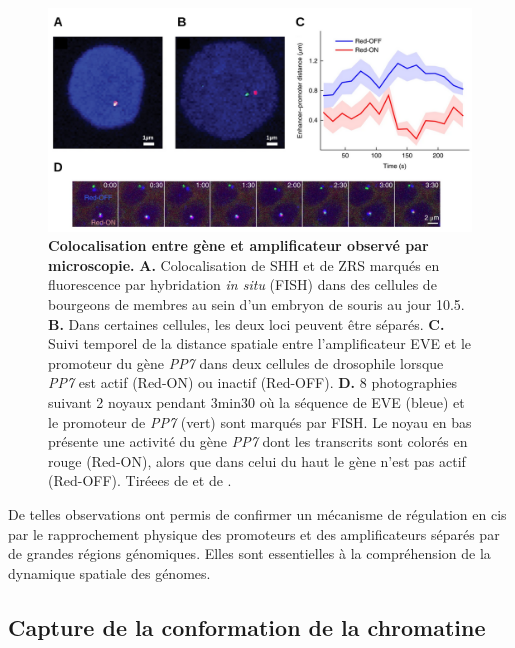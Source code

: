 \begin{figure}[h]
 \centering
 \includegraphics[width=1\textwidth, page=1] {figures/introduction/fig15-17.png}
 \caption[Colocalisation entre gène et \gls{amplificateur} observé par microscopie.]{
 \textbf{Colocalisation entre gène et \gls{amplificateur} observé par microscopie.}
 \textbf{A.} Colocalisation de \acrshort{SHH} et de \acrshort{ZRS} marqués en fluorescence par hybridation \textit{in situ} (FISH) dans des cellules de bourgeons de membres au sein d'un embryon de souris au jour 10.5.
 \textbf{B.} Dans certaines cellules, les deux loci peuvent être séparés.
 \textbf{C.} Suivi temporel de la distance spatiale entre l'\gls{amplificateur} EVE et le promoteur du gène \textit{PP7} dans deux cellules de drosophile lorsque \textit{PP7} est actif (Red-ON) ou inactif (Red-OFF).
 \textbf{D.} 8 photographies suivant 2 noyaux pendant 3min30 où la séquence de EVE (bleue) et le promoteur de \textit{PP7} (vert) sont marqués par FISH. Le noyau en bas présente une activité du gène \textit{PP7} dont les transcrits sont colorés en rouge (Red-ON), alors que dans celui du haut le gène n'est pas actif (Red-OFF).
 Tiréees de \citet{amano_chromosomal_2009} et de \citet{chen_dynamic_2018}.\\
 }
 \label{fig:fig15-17}
\end{figure}

De telles observations ont permis de confirmer un mécanisme de régulation en \gls{cis} par le rapprochement physique des promoteurs et des \glspl{amplificateur} séparés par de grandes régions génomiques. Elles sont essentielles à la compréhension de la dynamique spatiale des génomes.

\subsection{Capture de la conformation de la chromatine}
\label{subsec:HiC}

